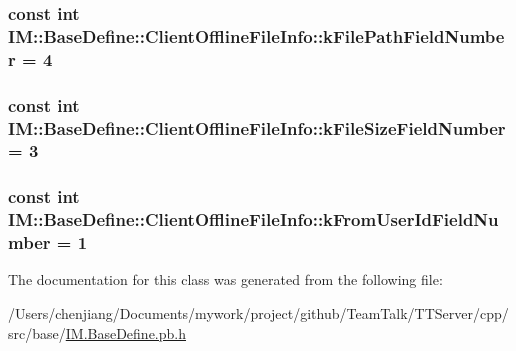 \subsubsection[{k\+File\+Path\+Field\+Number}]{\setlength{\rightskip}{0pt plus 5cm}const int I\+M\+::\+Base\+Define\+::\+Client\+Offline\+File\+Info\+::k\+File\+Path\+Field\+Number = 4\hspace{0.3cm}{\ttfamily [static]}}\label{class_i_m_1_1_base_define_1_1_client_offline_file_info_ac8294a45d765b4153b32eb048596ccb2}
\hypertarget{class_i_m_1_1_base_define_1_1_client_offline_file_info_a82cd9933ad625464752a268dd9fb5da8}{}
\subsubsection[{k\+File\+Size\+Field\+Number}]{\setlength{\rightskip}{0pt plus 5cm}const int I\+M\+::\+Base\+Define\+::\+Client\+Offline\+File\+Info\+::k\+File\+Size\+Field\+Number = 3\hspace{0.3cm}{\ttfamily [static]}}\label{class_i_m_1_1_base_define_1_1_client_offline_file_info_a82cd9933ad625464752a268dd9fb5da8}
\hypertarget{class_i_m_1_1_base_define_1_1_client_offline_file_info_aced475ce5415eda255aaa838241e49fd}{}
\subsubsection[{k\+From\+User\+Id\+Field\+Number}]{\setlength{\rightskip}{0pt plus 5cm}const int I\+M\+::\+Base\+Define\+::\+Client\+Offline\+File\+Info\+::k\+From\+User\+Id\+Field\+Number = 1\hspace{0.3cm}{\ttfamily [static]}}\label{class_i_m_1_1_base_define_1_1_client_offline_file_info_aced475ce5415eda255aaa838241e49fd}


The documentation for this class was generated from the following file\+:\begin{DoxyCompactItemize}
\item 
/\+Users/chenjiang/\+Documents/mywork/project/github/\+Team\+Talk/\+T\+T\+Server/cpp/src/base/\hyperlink{_i_m_8_base_define_8pb_8h}{I\+M.\+Base\+Define.\+pb.\+h}\end{DoxyCompactItemize}
